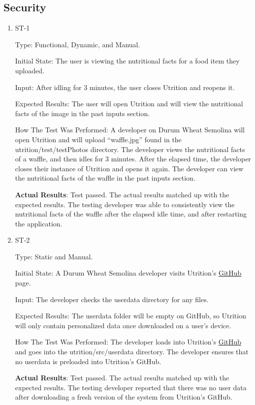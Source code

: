 \documentclass[12pt, titlepage]{article}
\begin{document}
	\subsection{Security}
	
	\begin{enumerate}
		
		\item{ST-1} 
		
		Type: Functional, Dynamic, and Manual.
		
		Initial State: The user is viewing the nutritional facts for a food item they uploaded.
		
		Input: After idling for 3 minutes, the user closes Utrition and reopens it.
		
		Expected Results: The user will open Utrition and will view the nutritional facts of the image in the past inputs section.
		
		How The Test Was Performed: A developer on Durum Wheat Semolina will open Utrition and will upload “waffle.jpg” found in the utrition/test/testPhotos directory. The developer views the nutritional facts of a waffle, and then idles for 3 minutes. After the elapsed time, the developer closes their instance of Utrition and opens it again. The developer can view the nutritional facts of the waffle in the past inputs section.
		
		\textbf{Actual Results}: Test passed. The actual results matched up with the expected results. The testing developer was able to consistently view the nutritional facts of the waffle after the elapsed idle time, and after restarting the application. 
		
		\item{ST-2} 
		
		Type: Static and Manual.
		
		Initial State: A Durum Wheat Semolina developer visits Utrition’s \href{https://github.com/jeff-rey-wang/utrition/}{GitHub} page.
		
		Input: The developer checks the userdata directory for any files.
		
		Expected Results: The userdata folder will be empty on GitHub, so Utrition will only contain personalized data once downloaded on a user's device.
		
		How The Test Was Performed: The developer loads into Utrition’s \href{https://github.com/jeff-rey-wang/utrition/}{GitHub} and goes into the utrition/src/userdata directory. The developer ensures that no userdata is preloaded into Utrition’s GitHub.
		
		\textbf{Actual Results}: Test passed. The actual results matched up with the expected results. The testing developer reported that there was no user data after downloading a fresh version of the system from Utrition's GitHub.
		
		
	\end{enumerate}
	
\end{document}
